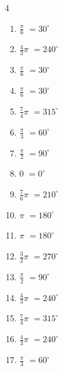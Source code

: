 \begin{multicols}{4}
\begin{enumerate}
  \item $\displaystyle \frac{\pi}{6}$
        $\displaystyle =30^{\circ}$

  \item $\displaystyle \frac{4}{3}\pi$
        $\displaystyle =240^{\circ}$

  \item $\displaystyle \frac{\pi}{6}$
        $\displaystyle =30^{\circ}$

  \item $\displaystyle \frac{\pi}{6}$
        $\displaystyle =30^{\circ}$

  \item $\displaystyle \frac{7}{4}\pi$
        $\displaystyle =315^{\circ}$

  \item $\displaystyle \frac{\pi}{3}$
        $\displaystyle =60^{\circ}$

  \item $\displaystyle \frac{\pi}{2}$
        $\displaystyle =90^{\circ}$

  \item $\displaystyle 0$
        $\displaystyle =0^{\circ}$

  \item $\displaystyle \frac{7}{6}\pi$
        $\displaystyle =210^{\circ}$

  \item $\displaystyle \pi$
        $\displaystyle =180^{\circ}$

  \item $\displaystyle \pi$
        $\displaystyle =180^{\circ}$

  \item $\displaystyle \frac{3}{2}\pi$
        $\displaystyle =270^{\circ}$

  \item $\displaystyle \frac{\pi}{2}$
        $\displaystyle =90^{\circ}$

  \item $\displaystyle \frac{4}{3}\pi$
        $\displaystyle =240^{\circ}$

  \item $\displaystyle \frac{7}{4}\pi$
        $\displaystyle =315^{\circ}$

  \item $\displaystyle \frac{4}{3}\pi$
        $\displaystyle =240^{\circ}$

\columnbreak %

  \item $\displaystyle \frac{\pi}{3}$
        $\displaystyle =60^{\circ}$


\end{enumerate}
\end{multicols}
